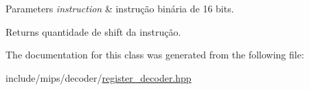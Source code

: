 \begin{DoxyParams}{Parameters}
{\em instruction} & instrução binária de 16 bits. \\
\hline
\end{DoxyParams}
\begin{DoxyReturn}{Returns}
quantidade de shift da instrução. 
\end{DoxyReturn}


The documentation for this class was generated from the following file\+:\begin{DoxyCompactItemize}
\item 
include/mips/decoder/\hyperlink{register__decoder_8hpp}{register\+\_\+decoder.\+hpp}\end{DoxyCompactItemize}
